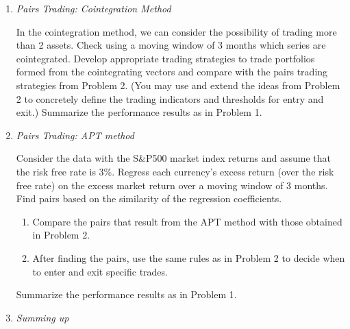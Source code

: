 \begin{enumerate}[1.]
\begin{enumerate}
\item {\it Pairs Trading: Cointegration Method}

In the cointegration method, we can consider the possibility of trading more than 2 assets. Check using a moving window of 3 months which series are cointegrated. Develop appropriate trading strategies to trade portfolios formed from the cointegrating vectors and compare with the pairs trading strategies from Problem 2. (You may use and extend the ideas from Problem 2 to concretely define the trading indicators and thresholds for entry and exit.) Summarize the performance results as in Problem 1.

\item {\it Pairs Trading: APT method}

Consider the data with the S\&P500 market index returns and assume that the risk free rate is 3\%. Regress each currency's excess return (over the risk free rate) on the excess market return over a moving window of 3 months. Find pairs based on the similarity of the regression coefficients.
\begin{enumerate}
\item Compare the pairs that result from the APT method with those obtained in Problem 2.
\item After finding the pairs, use the same rules as in Problem 2 to decide when to enter and exit specific trades.
\end{enumerate}
Summarize the performance results as in Problem 1.

\item {\it Summing up}


\end{enumerate}
\end{enumerate}
